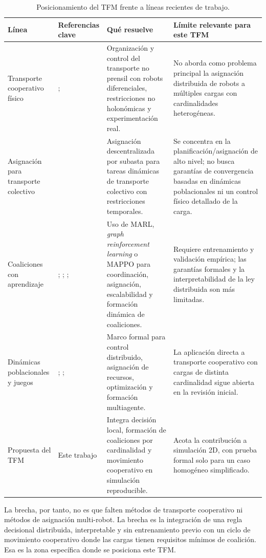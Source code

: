 \documentclass[11pt,a4paper]{article}
\begin{document}
\begin{table}[htbp]
\centering
\small
\caption{Posicionamiento del TFM frente a líneas recientes de trabajo.}
\begin{tabular}{p{2.7cm}p{3.0cm}p{4.0cm}p{4.4cm}}
\toprule
\textbf{Línea} & \textbf{Referencias clave} & \textbf{Qué resuelve} & \textbf{Límite relevante para este TFM} \\
\midrule
Transporte cooperativo físico & \citet{ebel2024cooperative}; \citet{rosenfelder2024force} & Organización y control del transporte no prensil con robots diferenciales, restricciones no holonómicas y experimentación real. & No aborda como problema principal la asignación distribuida de robots a múltiples cargas con cardinalidades heterogéneas. \\
\addlinespace
Asignación para transporte colectivo & \citet{shan2024distributed} & Asignación descentralizada por subasta para tareas dinámicas de transporte colectivo con restricciones temporales. & Se concentra en la planificación/asignación de alto nivel; no busca garantías de convergencia basadas en dinámicas poblacionales ni un control físico detallado de la carga. \\
\addlinespace
Coaliciones con aprendizaje & \citet{shibata2023event}; \citet{shibata2023learning}; \citet{paul2023efficient}; \citet{bezerra2025learning} & Uso de MARL, \textit{graph reinforcement learning} o MAPPO para coordinación, asignación, escalabilidad y formación dinámica de coaliciones. & Requiere entrenamiento y validación empírica; las garantías formales y la interpretabilidad de la ley distribuida son más limitadas. \\
\addlinespace
Dinámicas poblacionales y juegos & \citet{quijano2017population}; \citet{barreiro2017distributed}; \citet{martinez2020formation} & Marco formal para control distribuido, asignación de recursos, optimización y formación multiagente. & La aplicación directa a transporte cooperativo con cargas de distinta cardinalidad sigue abierta en la revisión inicial. \\
\addlinespace
Propuesta del TFM & Este trabajo & Integra decisión local, formación de coaliciones por cardinalidad y movimiento cooperativo en simulación reproducible. & Acota la contribución a simulación 2D, con prueba formal solo para un caso homogéneo simplificado. \\
\bottomrule
\end{tabular}
\end{table}

La brecha, por tanto, no es que falten métodos de transporte cooperativo ni métodos de asignación multi-robot. La brecha es la integración de una regla decisional distribuida, interpretable y sin entrenamiento previo con un ciclo de movimiento cooperativo donde las cargas tienen requisitos mínimos de coalición. Esa es la zona específica donde se posiciona este TFM.
\end{document}
